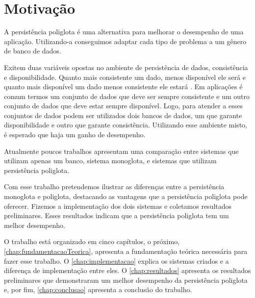 \section{Motivação}
\label{sec:motivacao}
A persistência poliglota é uma alternativa para melhorar o desempenho de uma aplicação. Utilizando-a conseguimos adaptar cada tipo de problema a um gênero de banco de dados.

Exitem duas variáveis opostas no ambiente de persistência de dados, consistência e disponibilidade. Quanto mais consistente um dado, menos disponível ele será e quanto mais disponível um dado menos consistente ele estará \cite{NoSQL}. Em aplicações é comum termos um conjunto de dados que deve ser sempre consistente e um outro conjunto de dados que deve estar sempre disponível. Logo, para atender a esses conjuntos de dados podem ser utilizados dois bancos de dados, um que garante disponibilidade e outro que garante  consistência. Utilizando esse ambiente misto, é esperado que haja um ganho de desempenho.

Atualmente poucos trabalhos apresentam uma comparação entre sistemas que utilizam apenas um banco, sistema monoglota,  e sistemas que utilizam persistência poliglota.

Com esse trabalho pretendemos ilustrar as diferenças entre a persistência monoglota e poliglota, destacando as vantagens que a persistência poliglota pode oferecer. Fizemos a implementação dos dois sistemas e coletamos resultados preliminares. Esses resultados indicam que a persistência poliglota tem um melhor desempenho.

O trabalho está organizado em cinco capítulos, o próximo, \autoref{chap:fundamentacaoTeorica}, apresenta a fundamentação teórica necessária para fazer esse trabalho. O \autoref{chap:implementacao} explica os sistemas criados e a diferença de implementação entre eles. O \autoref{chap:resultados} apresenta os resultados preliminares que demonstraram um melhor desempenho da persistência poliglota e, por fim, \autoref{chap:conclusao} apresenta a conclusão do trabalho.





